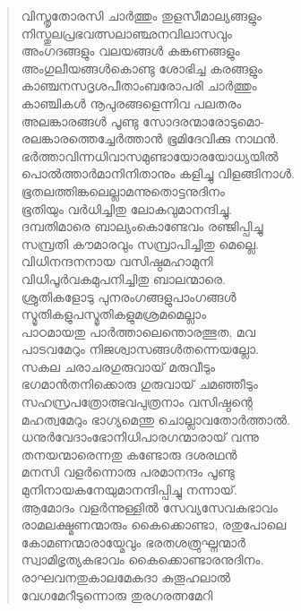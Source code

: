 \begin{verse}
വിസ്തൃതോരസി ചാര്‍ത്തും തുളസീമാല്യങ്ങളും\\
നിസ്തുലപ്രഭവത്സലാഞ്ഛനവിലാസവും\\
അംഗദങ്ങളും വലയങ്ങള്‍ കങ്കണങ്ങളും\\
അംഗുലീയങ്ങള്‍കൊണ്ടു ശോഭിച്ച കരങ്ങളും\\
കാഞ്ചനസദൃശപീതാംബരോപരി ചാര്‍ത്തും\\
കാഞ്ചികള്‍ നൂപുരങ്ങളെന്നിവ പലതരം\\
അലങ്കാരങ്ങള്‍ പൂണ്ടു സോദരന്മാരോടുമൊ-\\
രലങ്കാരത്തെച്ചേര്‍ത്താന്‍ ഭൂമിദേവിക്കു നാഥന്‍.\\
ഭര്‍ത്താവിന്നധിവാസമുണ്ടായോരയോധ്യയില്‍\\
പൊല്‍ത്താര്‍മാനിനിതാനും കളിച്ചു വിളങ്ങിനാള്‍.\\
ഭൂതലത്തിങ്കലെല്ലാമന്നുതൊട്ടനുദിനം\\
ഭൂതിയും വര്‍ധിച്ചിതു ലോകവുമാനന്ദിച്ചു.\\
ദമ്പതിമാരെ ബാല്യംകൊണ്ടേവം രഞ്ജിപ്പിച്ചു\\
സമ്പ്രതി കൗമാരവും സമ്പ്രാപിച്ചിതു മെല്ലെ.\\
വിധിനന്ദനനായ വസിഷ്ഠമഹാമുനി\\
വിധിപൂര്‍വകമുപനിച്ചിതു ബാലന്മാരെ.\\
ശ്രുതികളോടു പുനരംഗങ്ങളുപാംഗങ്ങള്‍\\
സ്മൃതികളുപസ്മൃതികളുമശ്രമമെല്ലാം\\
പാഠമായതു പാര്‍ത്താലെന്തൊരത്ഭുത, മവ\\
പാടവമേറും നിജശ്വാസങ്ങള്‍തന്നെയല്ലോ.\\
സകല ചരാചരഗുരുവായ് മരുവീടും\\
ഭഗമാന്‍തനിക്കൊരു ഗുരുവായ് ചമഞ്ഞീടും\\
സഹസ്രപത്രോത്ഭവപുത്രനാം വസിഷ്ഠന്റെ\\
മഹത്വമേറും ഭാഗ്യമെന്തു ചൊല്ലാവതോര്‍ത്താല്‍.\\
ധനുര്‍വേദാംഭോനിധിപാരഗന്മാരായ് വന്നു\\
തനയന്മാരെന്നതു കണ്ടോരു ദശരഥന്‍\\
മനസി വളര്‍ന്നൊരു പരമാനന്ദം പൂണ്ടു\\
മുനിനായകനേയുമാനന്ദിപ്പിച്ചു നന്നായ്.\\
ആമോദം വളര്‍ന്നുള്ളില്‍ സേവ്യസേവകഭാവം\\
രാമലക്ഷ്മണന്മാരും കൈക്കൊണ്ടാ, രതുപോലെ\\
കോമണന്മാരായ്മേവും ഭരതശത്രുഘ്നന്മാര്‍\\
സ്വാമിഭൃത്യകഭാവം കൈക്കൊണ്ടാരനുദിനം.\\
രാഘവനതുകാലമേകദാ കുതൂഹലാല്‍\\
വേഗമേറീടുന്നൊരു തുരഗരത്നമേറി\\

\end{verse}
